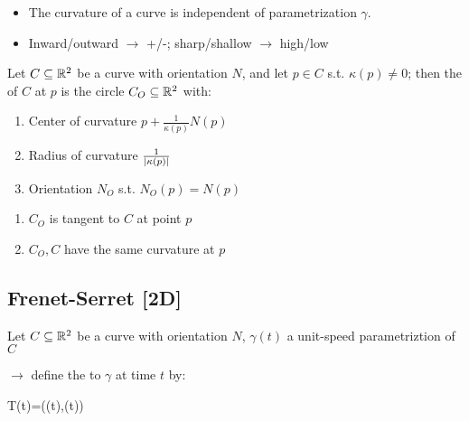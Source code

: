 \documentclass[13pt]{extarticle}
\begin{document}
\begin{note}
    \begin{itemize}
        \item The curvature of a curve is independent of parametrization $\gamma$.
        \item Inward/outward $\to$ +/-; sharp/shallow $\to$ high/low
    \end{itemize}
\end{note}

\vspace{-4pt}
\begin{definition}
    Let $C\subseteq\mathbb{R}^2$ be a curve with orientation $N$, and let $p\in C$ s.t. $\kappa(p)\neq0$; then the  of $C$ at $p$ is the circle $C_O\subseteq\mathbb{R}^2$ with: \begin{enumerate}
        \item Center of curvature $p+\frac{1}{\kappa(p)}N(p)$
        \item Radius of curvature $\frac{1}{\left|\kappa(p)\right|}$
        \item Orientation $N_O$ s.t. $N_O(p)=N(p)$
    \end{enumerate}
\end{definition}

\newp
{}
\begin{enumerate}
    \item $C_O$ is tangent to $C$ at point $p$
    \item $C_O,C$ have the same curvature at $p$
\end{enumerate}

\newp
\subsection{Frenet-Serret [2D]}
\begin{definition}
    Let $C\subseteq\mathbb{R}^2$ be a curve with orientation $N$, $\gamma(t)$ a unit-speed parametriztion of $C$

    \pstart
    $\rightarrow$ define the  to $\gamma$ at time $t$ by: \begin{eqnbox}
        T(t)=(\gamma(t),\dot\gamma(t))
    \end{eqnbox}
\end{definition}
\end{document}
